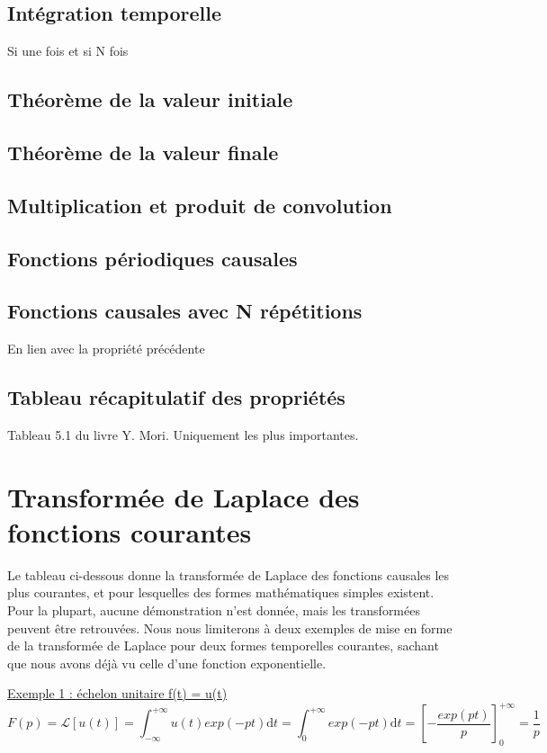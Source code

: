 \documentclass[]{report}
\newcommand{\deriv}{\mathrm{d}}
\begin{document}
	\subsection{Intégration temporelle}
	Si une fois et si N fois
	
	\subsection{Théorème de la valeur initiale}
	
	\subsection{Théorème de la valeur finale}
	
	\subsection{Multiplication et produit de convolution}
	
	\subsection{Fonctions périodiques causales}
	
	\subsection{Fonctions causales avec N répétitions}
	En lien avec la propriété précédente
	
	\subsection{Tableau récapitulatif des propriétés}
	Tableau 5.1 du livre Y. Mori.
	Uniquement les plus importantes.
	
	
	\section{Transformée de Laplace des fonctions courantes}
	Le tableau ci-dessous donne la transformée de Laplace des fonctions causales les plus courantes, et pour lesquelles des formes mathématiques simples existent. Pour la plupart, aucune démonstration n'est donnée, mais les transformées peuvent être retrouvées. Nous nous limiterons à deux exemples de mise en forme de la transformée de Laplace pour deux formes temporelles courantes, sachant que nous avons déjà vu celle d'une fonction exponentielle.
	
	\underline{Exemple 1 : échelon unitaire f(t) = u(t)}
	\begin{equation*}
	F(p)=\mathcal{L}[u(t)] = \int_{-\infty}^{+\infty}u(t)exp(-pt) \deriv t =\int_{0}^{+\infty}exp(-pt) \deriv t = [-\frac{exp(pt)}{p}]_{0}^{+\infty}=\frac{1}{p}
	\end{equation*}
	
\end{document}
